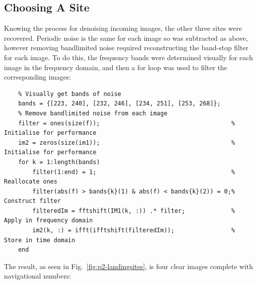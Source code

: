 \documentclass[12pt]{article}
\begin{document}
\subsection{Choosing A Site}
Knowing the process for denoising incoming images, the other three sites were
recovered. Periodic noise is the same for each image so was subtracted as
above, however removing bandlimited noise required reconstructing the band-stop
filter for each image. To do this, the frequency bands were determined visually
for each image in the frequency domain, and then a for loop was used to filter
the corresponding images:
\begin{verbatim}
    % Visually get bands of noise
    bands = {[223, 240], [232, 246], [234, 251], [253, 268]};
    % Remove bandlimited noise from each image
    filter = ones(size(f));                                     % Initialise for performance
    im2 = zeros(size(im1));                                     % Initialise for performance
    for k = 1:length(bands)
        filter(1:end) = 1;                                      % Reallocate ones
        filter(abs(f) > bands{k}(1) & abs(f) < bands{k}(2)) = 0;% Construct filter
        filteredIm = fftshift(IM1(k, :)) .* filter;             % Apply in frequency domain
        im2(k, :) = ifft(ifftshift(filteredIm));                % Store in time domain
    end
\end{verbatim}

The result, as seen in Fig.~\ref{fig:p2-landingsites}, is four clear images
complete with navigational numbers: \vspace*{5pt}
\end{document}
